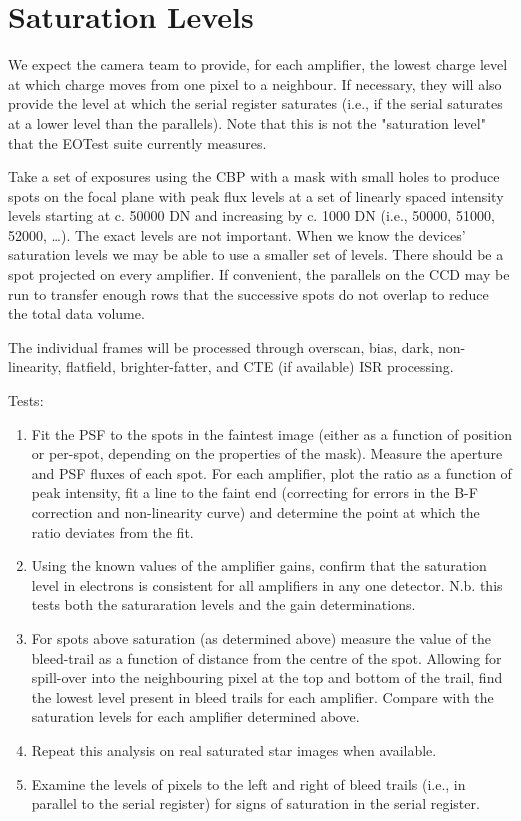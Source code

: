 \documentclass[DM,authoryear,toc,lsstdraft]{lsstdoc}
\begin{document}
\section{Saturation Levels}

We expect the camera team to provide, for each amplifier, the lowest charge level at which charge moves from
one pixel to a neighbour.  If necessary, they will also provide the level at which the serial register
saturates (i.e., if the serial saturates at a lower level than the parallels). Note that this is not
the "saturation level" that the EOTest suite currently measures.

Take a set of exposures using the CBP with a mask with small holes to produce spots on the focal plane with
peak flux levels at a set of linearly spaced intensity levels starting at c. 50000 DN and increasing by
c. 1000 DN (i.e., 50000, 51000, 52000, \ldots{}). The exact levels are not important. When we know the devices'
saturation levels we may be able to use a smaller set of levels.  There should be a spot projected on every
amplifier.  If convenient, the parallels on the CCD may be run to transfer enough rows that the successive
spots do not overlap to reduce the total data volume.

The individual frames will be processed through overscan, bias, dark, non-linearity, flatfield,
brighter-fatter, and CTE (if available) ISR processing.

Tests:
\begin{enumerate}
\item Fit the PSF to the spots in the faintest image (either as a function of position or per-spot, depending on
the properties of the mask).  Measure the aperture and PSF fluxes of each spot. For each amplifier, plot
the ratio as a function of peak intensity, fit a line to the faint end (correcting for errors in the B-F
correction and non-linearity curve) and determine the point at which the ratio deviates from the fit.
\item Using the known values of the amplifier gains, confirm that the saturation level in electrons is consistent
for all amplifiers in any one detector.  N.b. this tests both the saturaration levels and the gain
determinations.
\item For spots above saturation (as determined above) measure the value of the bleed-trail as a function of
distance from the centre of the spot.  Allowing for spill-over into the neighbouring pixel at the top and
bottom of the trail, find the lowest level present in bleed trails for each amplifier.  Compare with
the saturation levels for each amplifier determined above.
\item Repeat this analysis on real saturated star images when available.
\item Examine the levels of pixels to the left and right of bleed trails (i.e., in parallel to the serial
register) for signs of saturation in the serial register.
\end{enumerate}
\end{document}
